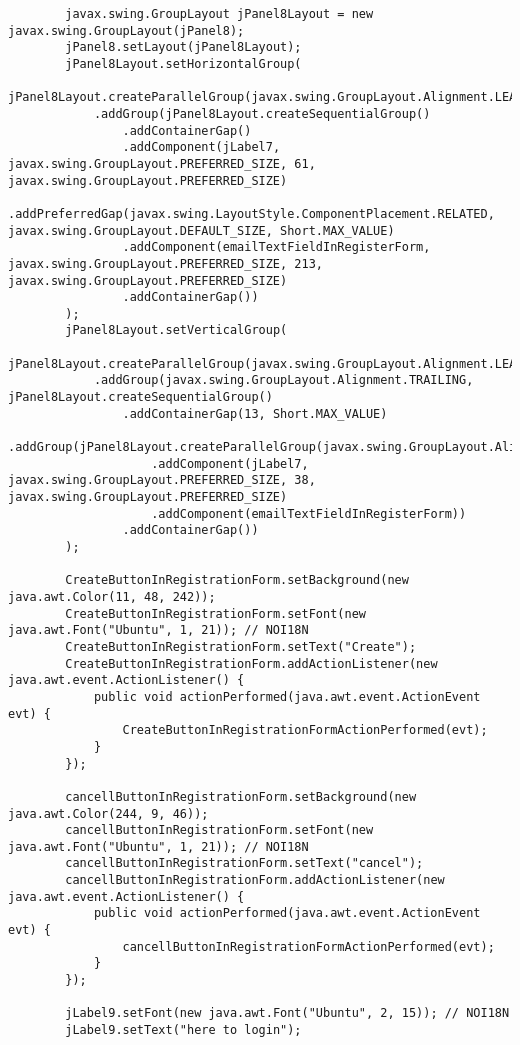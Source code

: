 \documentclass[12pt,a4paper]{article}
\begin{document}
\begin{lstlisting}
        javax.swing.GroupLayout jPanel8Layout = new javax.swing.GroupLayout(jPanel8);
        jPanel8.setLayout(jPanel8Layout);
        jPanel8Layout.setHorizontalGroup(
            jPanel8Layout.createParallelGroup(javax.swing.GroupLayout.Alignment.LEADING)
            .addGroup(jPanel8Layout.createSequentialGroup()
                .addContainerGap()
                .addComponent(jLabel7, javax.swing.GroupLayout.PREFERRED_SIZE, 61, javax.swing.GroupLayout.PREFERRED_SIZE)
                .addPreferredGap(javax.swing.LayoutStyle.ComponentPlacement.RELATED, javax.swing.GroupLayout.DEFAULT_SIZE, Short.MAX_VALUE)
                .addComponent(emailTextFieldInRegisterForm, javax.swing.GroupLayout.PREFERRED_SIZE, 213, javax.swing.GroupLayout.PREFERRED_SIZE)
                .addContainerGap())
        );
        jPanel8Layout.setVerticalGroup(
            jPanel8Layout.createParallelGroup(javax.swing.GroupLayout.Alignment.LEADING)
            .addGroup(javax.swing.GroupLayout.Alignment.TRAILING, jPanel8Layout.createSequentialGroup()
                .addContainerGap(13, Short.MAX_VALUE)
                .addGroup(jPanel8Layout.createParallelGroup(javax.swing.GroupLayout.Alignment.BASELINE)
                    .addComponent(jLabel7, javax.swing.GroupLayout.PREFERRED_SIZE, 38, javax.swing.GroupLayout.PREFERRED_SIZE)
                    .addComponent(emailTextFieldInRegisterForm))
                .addContainerGap())
        );

        CreateButtonInRegistrationForm.setBackground(new java.awt.Color(11, 48, 242));
        CreateButtonInRegistrationForm.setFont(new java.awt.Font("Ubuntu", 1, 21)); // NOI18N
        CreateButtonInRegistrationForm.setText("Create");
        CreateButtonInRegistrationForm.addActionListener(new java.awt.event.ActionListener() {
            public void actionPerformed(java.awt.event.ActionEvent evt) {
                CreateButtonInRegistrationFormActionPerformed(evt);
            }
        });

        cancellButtonInRegistrationForm.setBackground(new java.awt.Color(244, 9, 46));
        cancellButtonInRegistrationForm.setFont(new java.awt.Font("Ubuntu", 1, 21)); // NOI18N
        cancellButtonInRegistrationForm.setText("cancel");
        cancellButtonInRegistrationForm.addActionListener(new java.awt.event.ActionListener() {
            public void actionPerformed(java.awt.event.ActionEvent evt) {
                cancellButtonInRegistrationFormActionPerformed(evt);
            }
        });

        jLabel9.setFont(new java.awt.Font("Ubuntu", 2, 15)); // NOI18N
        jLabel9.setText("here to login");


\end{lstlisting}
\end{document}

